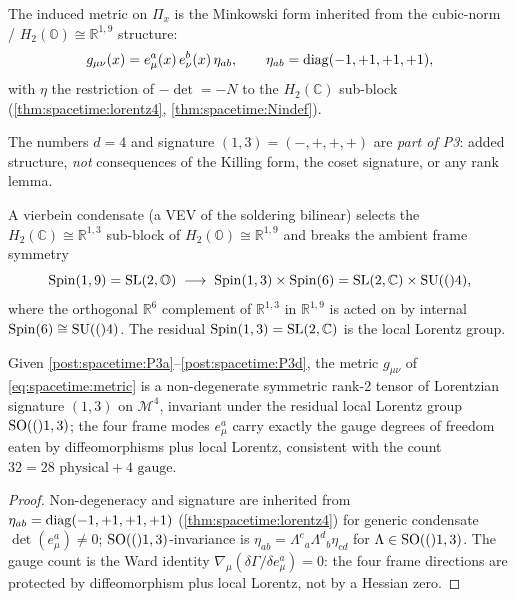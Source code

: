 \begin{postulate}\label{post:spacetime:P3b}
The induced metric on $\Pi_x$ is the Minkowski form inherited from the cubic-norm /
$H_2(\mathbb O)\cong\mathbb R^{1,9}$ structure:
\begin{equation}\label{eq:spacetime:metric}
  g_{\mu\nu}(x)=e^a_\mu(x)\,e^b_\nu(x)\,\eta_{ab},\qquad
  \eta_{ab}=\operatorname{diag}(-1,+1,+1,+1),
\end{equation}
with $\eta$ the restriction of $-\det=-N$ to the $H_2(\mathbb C)$ sub-block
(\autoref{thm:spacetime:lorentz4}, \autoref{thm:spacetime:Nindef}).
\end{postulate}

\begin{postulate}\label{post:spacetime:P3c}
The numbers $d=4$ and signature $(1,3)=(-,+,+,+)$ are \emph{part of P3}: added
structure, \emph{not} consequences of the Killing form, the coset signature, or any
rank lemma.
\end{postulate}

\begin{postulate}\label{post:spacetime:P3d}
A vierbein condensate (a VEV of the soldering bilinear) selects the
$H_2(\mathbb C)\cong\mathbb R^{1,3}$ sub-block of $H_2(\mathbb O)\cong\mathbb R^{1,9}$ and
breaks the ambient frame symmetry
\begin{equation}\label{eq:spacetime:framebreak}
  \operatorname{Spin}(1,9)=\mathrm{SL}(2,\mathbb O)\;\longrightarrow\;\operatorname{Spin}(1,3)\times\operatorname{Spin}(6)
  =\mathrm{SL}(2,\mathbb C)\times\mathrm{SU}(()4),
\end{equation}
where the orthogonal $\mathbb R^6$ complement of $\mathbb R^{1,3}$ in $\mathbb R^{1,9}$
is acted on by internal $\operatorname{Spin}(6)\cong\mathrm{SU}(()4)$. The residual $\operatorname{Spin}(1,3)=\mathrm{SL}(2,\mathbb C)$
is the local Lorentz group.
\end{postulate}

\begin{theorem}\label{thm:spacetime:P3consistent}
Given \autoref{post:spacetime:P3a}--\autoref{post:spacetime:P3d}, the metric
$g_{\mu\nu}$ of \eqref{eq:spacetime:metric} is a non-degenerate symmetric rank-2 tensor
of Lorentzian signature $(1,3)$ on $\mathcal M^4$, invariant under the residual local
Lorentz group $\mathrm{SO}(()1,3)$; the four frame modes $e^a_\mu$ carry exactly the gauge
degrees of freedom eaten by diffeomorphisms plus local Lorentz, consistent with the
count $32=28\text{ physical}+4\text{ gauge}$.
\end{theorem}
\begin{proof}
Non-degeneracy and signature are inherited from $\eta_{ab}=\operatorname{diag}(-1,+1,+1,+1)$
(\autoref{thm:spacetime:lorentz4}) for generic condensate $\det(e^a_\mu)\ne0$;
$\mathrm{SO}(()1,3)$-invariance is $\eta_{ab}=\Lambda^c{}_a\Lambda^d{}_b\eta_{cd}$ for
$\Lambda\in\mathrm{SO}(()1,3)$. The gauge count is the Ward identity
$\nabla_\mu(\delta\Gamma/\delta e^a_\mu)=0$: the four frame directions are protected by
diffeomorphism plus local Lorentz, not by a Hessian zero.
\end{proof}

